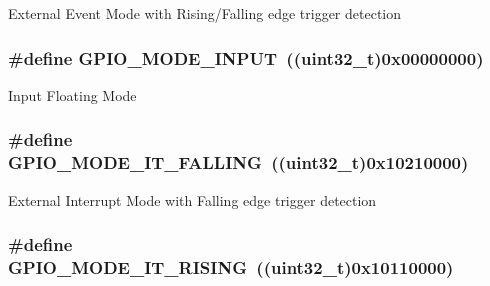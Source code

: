 External Event Mode with Rising/\-Falling edge trigger detection \hypertarget{group___g_p_i_o__mode_gaf40bec3146810028a84b628d37d3b391}{
\subsubsection[{G\-P\-I\-O\-\_\-\-M\-O\-D\-E\-\_\-\-I\-N\-P\-U\-T}]{\setlength{\rightskip}{0pt plus 5cm}\#define G\-P\-I\-O\-\_\-\-M\-O\-D\-E\-\_\-\-I\-N\-P\-U\-T~((uint32\-\_\-t)0x00000000)}}\label{group___g_p_i_o__mode_gaf40bec3146810028a84b628d37d3b391}
Input Floating Mode \hypertarget{group___g_p_i_o__mode_gaa166210a6da3ac7e8d7504702520e522}{
\subsubsection[{G\-P\-I\-O\-\_\-\-M\-O\-D\-E\-\_\-\-I\-T\-\_\-\-F\-A\-L\-L\-I\-N\-G}]{\setlength{\rightskip}{0pt plus 5cm}\#define G\-P\-I\-O\-\_\-\-M\-O\-D\-E\-\_\-\-I\-T\-\_\-\-F\-A\-L\-L\-I\-N\-G~((uint32\-\_\-t)0x10210000)}}\label{group___g_p_i_o__mode_gaa166210a6da3ac7e8d7504702520e522}
External Interrupt Mode with Falling edge trigger detection \hypertarget{group___g_p_i_o__mode_ga088659562e68426d9a72821ea4fd8d50}{
\subsubsection[{G\-P\-I\-O\-\_\-\-M\-O\-D\-E\-\_\-\-I\-T\-\_\-\-R\-I\-S\-I\-N\-G}]{\setlength{\rightskip}{0pt plus 5cm}\#define G\-P\-I\-O\-\_\-\-M\-O\-D\-E\-\_\-\-I\-T\-\_\-\-R\-I\-S\-I\-N\-G~((uint32\-\_\-t)0x10110000)}}\label{group___g_p_i_o__mode_ga088659562e68426d9a72821ea4fd8d50}
